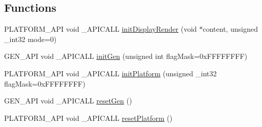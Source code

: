 \subsection*{Functions}
\begin{DoxyCompactItemize}
\item 
P\-L\-A\-T\-F\-O\-R\-M\-\_\-\-A\-P\-I void \-\_\-\-A\-P\-I\-C\-A\-L\-L \hyperlink{group__apiinterface_ga9f49951f137666ebf3419a3d6a7b3dae}{init\-Display\-Render} (void $\ast$content, unsigned \-\_\-int32 mode=0)
\item 
G\-E\-N\-\_\-\-A\-P\-I void \-\_\-\-A\-P\-I\-C\-A\-L\-L \hyperlink{group__apiinterface_ga02a93c2e6a9da1ca6e486201f9110a70}{init\-Gen} (unsigned int flag\-Mask=0x\-F\-F\-F\-F\-F\-F\-F\-F)
\item 
P\-L\-A\-T\-F\-O\-R\-M\-\_\-\-A\-P\-I void \-\_\-\-A\-P\-I\-C\-A\-L\-L \hyperlink{group__apiinterface_gaf0b5e7fee28b6014b4bef4de45e3f3e5}{init\-Platform} (unsigned \-\_\-int32 flag\-Mask=0x\-F\-F\-F\-F\-F\-F\-F\-F)
\item 
G\-E\-N\-\_\-\-A\-P\-I void \-\_\-\-A\-P\-I\-C\-A\-L\-L \hyperlink{group__apiinterface_ga6759dbcb500dea83c4b1cb6e7393b96b}{reset\-Gen} ()
\item 
P\-L\-A\-T\-F\-O\-R\-M\-\_\-\-A\-P\-I void \-\_\-\-A\-P\-I\-C\-A\-L\-L \hyperlink{group__apiinterface_gacbda8cfcccd62cd7cd719e6744c9a654}{reset\-Platform} ()
\end{DoxyCompactItemize}
